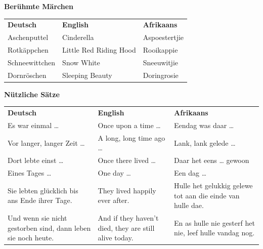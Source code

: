 \documentclass[12pt,a4paper]{article}
\begin{document}
\pagebreak

\begin{center}
    {\large\textbf{Berühmte Märchen}}
\end{center}

\begin{tabular}{@{}p{5cm} p{4.5cm} p{4.5cm}@{}}

\textbf{Deutsch} & \textbf{English} & \textbf{Afrikaans} \\[4pt]

Aschenputtel
    & Cinderella
    & Aspoestertjie \\

Rotkäppchen
    & Little Red Riding Hood
    & Rooikappie \\

Schneewittchen
    & Snow White
    & Sneeuwitjie \\

Dornröschen
    & Sleeping Beauty
    & Doringrosie \\

\end{tabular}

\begin{center}
    {\large\textbf{Nützliche Sätze}}
\end{center}

\begin{tabular}{@{}p{5cm} p{4.5cm} p{4.5cm}@{}}

\textbf{Deutsch} & \textbf{English} & \textbf{Afrikaans} \\[4pt]

Es war einmal …
    & Once upon a time …
    & Eendag was daar … \\

Vor langer, langer Zeit …
    & A long, long time ago …
    & Lank, lank gelede … \\

Dort lebte einst …
    & Once there lived …
    & Daar het eens … gewoon \\

Eines Tages …
    & One day …
    & Een dag … \\

Sie lebten glücklich bis ans Ende ihrer Tage.
    & They lived happily ever after.
    & Hulle het gelukkig gelewe tot aan die einde van hulle dae. \\

Und wenn sie nicht gestorben sind,
dann leben sie noch heute.
    & And if they haven't died,
      they are still alive today.
    & En as hulle nie gesterf het nie,
      leef hulle vandag nog. \\

\end{tabular}

\vspace{2em}
\end{document}
